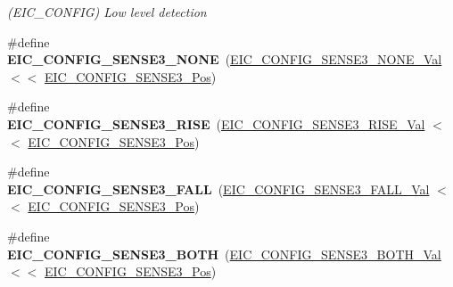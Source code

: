 \begin{DoxyCompactItemize}
\begin{DoxyCompactList}\small\item\em (E\+I\+C\+\_\+\+C\+O\+N\+F\+I\+G) Low level detection \end{DoxyCompactList}\item 
\hypertarget{group___s_a_m_l21___e_i_c_ga98941a10dd51749042a10b67ed8eb3b2}{}\#define {\bfseries E\+I\+C\+\_\+\+C\+O\+N\+F\+I\+G\+\_\+\+S\+E\+N\+S\+E3\+\_\+\+N\+O\+N\+E}~(\hyperlink{group___s_a_m_l21___e_i_c_gae6cb4f8bb0afd3fd2c89dad8d552ec1f}{E\+I\+C\+\_\+\+C\+O\+N\+F\+I\+G\+\_\+\+S\+E\+N\+S\+E3\+\_\+\+N\+O\+N\+E\+\_\+\+Val}    $<$$<$ \hyperlink{group___s_a_m_l21___e_i_c_ga831aeaf54a89c732e999bddee6ad0cbf}{E\+I\+C\+\_\+\+C\+O\+N\+F\+I\+G\+\_\+\+S\+E\+N\+S\+E3\+\_\+\+Pos})\label{group___s_a_m_l21___e_i_c_ga98941a10dd51749042a10b67ed8eb3b2}

\item 
\hypertarget{group___s_a_m_l21___e_i_c_ga1ca0923ce75dad191065a40e021b6028}{}\#define {\bfseries E\+I\+C\+\_\+\+C\+O\+N\+F\+I\+G\+\_\+\+S\+E\+N\+S\+E3\+\_\+\+R\+I\+S\+E}~(\hyperlink{group___s_a_m_l21___e_i_c_gae1f57c9ebb1706bb46bc77ef24f56a81}{E\+I\+C\+\_\+\+C\+O\+N\+F\+I\+G\+\_\+\+S\+E\+N\+S\+E3\+\_\+\+R\+I\+S\+E\+\_\+\+Val}    $<$$<$ \hyperlink{group___s_a_m_l21___e_i_c_ga831aeaf54a89c732e999bddee6ad0cbf}{E\+I\+C\+\_\+\+C\+O\+N\+F\+I\+G\+\_\+\+S\+E\+N\+S\+E3\+\_\+\+Pos})\label{group___s_a_m_l21___e_i_c_ga1ca0923ce75dad191065a40e021b6028}

\item 
\hypertarget{group___s_a_m_l21___e_i_c_ga9f494d43bb1b2fd098c3acc91bd95bc2}{}\#define {\bfseries E\+I\+C\+\_\+\+C\+O\+N\+F\+I\+G\+\_\+\+S\+E\+N\+S\+E3\+\_\+\+F\+A\+L\+L}~(\hyperlink{group___s_a_m_l21___e_i_c_gaf4c91968458631be4fa57f3c0c15404c}{E\+I\+C\+\_\+\+C\+O\+N\+F\+I\+G\+\_\+\+S\+E\+N\+S\+E3\+\_\+\+F\+A\+L\+L\+\_\+\+Val}    $<$$<$ \hyperlink{group___s_a_m_l21___e_i_c_ga831aeaf54a89c732e999bddee6ad0cbf}{E\+I\+C\+\_\+\+C\+O\+N\+F\+I\+G\+\_\+\+S\+E\+N\+S\+E3\+\_\+\+Pos})\label{group___s_a_m_l21___e_i_c_ga9f494d43bb1b2fd098c3acc91bd95bc2}

\item 
\hypertarget{group___s_a_m_l21___e_i_c_ga14fc23701b9b6d750aac9c6fa9437907}{}\#define {\bfseries E\+I\+C\+\_\+\+C\+O\+N\+F\+I\+G\+\_\+\+S\+E\+N\+S\+E3\+\_\+\+B\+O\+T\+H}~(\hyperlink{group___s_a_m_l21___e_i_c_gaa8713c71e12ac27aed9182636e488bc6}{E\+I\+C\+\_\+\+C\+O\+N\+F\+I\+G\+\_\+\+S\+E\+N\+S\+E3\+\_\+\+B\+O\+T\+H\+\_\+\+Val}    $<$$<$ \hyperlink{group___s_a_m_l21___e_i_c_ga831aeaf54a89c732e999bddee6ad0cbf}{E\+I\+C\+\_\+\+C\+O\+N\+F\+I\+G\+\_\+\+S\+E\+N\+S\+E3\+\_\+\+Pos})\label{group___s_a_m_l21___e_i_c_ga14fc23701b9b6d750aac9c6fa9437907}


\end{DoxyCompactItemize}
